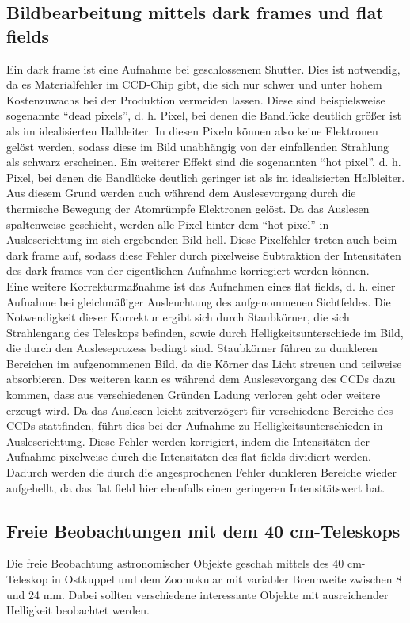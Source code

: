 \subsection{Bildbearbeitung mittels dark frames und flat fields}
Ein dark frame ist eine Aufnahme bei geschlossenem Shutter. Dies ist notwendig, da es Materialfehler im CCD-Chip gibt, die sich nur schwer und unter hohem Kostenzuwachs bei der Produktion vermeiden lassen. Diese sind beispielsweise sogenannte \enquote{dead pixels}, d. h. Pixel, bei denen die Bandlücke deutlich größer ist als im idealisierten Halbleiter. In diesen Pixeln können also keine Elektronen gelöst werden, sodass diese im Bild unabhängig von der einfallenden Strahlung als schwarz erscheinen.
Ein weiterer Effekt sind die sogenannten \enquote{hot pixel}. d. h. Pixel, bei denen die Bandlücke deutlich geringer ist als im idealisierten Halbleiter. Aus diesem Grund  werden auch während dem Auslesevorgang durch die thermische Bewegung der Atomrümpfe Elektronen gelöst. Da das Auslesen spaltenweise geschieht, werden alle Pixel hinter dem \enquote{hot pixel} in Ausleserichtung im sich ergebenden Bild hell. Diese Pixelfehler treten auch beim dark frame auf, sodass diese Fehler durch pixelweise Subtraktion der Intensitäten des dark frames von der eigentlichen Aufnahme korriegiert werden können. \\
Eine weitere Korrekturmaßnahme ist das Aufnehmen eines flat fields, d. h. einer Aufnahme bei gleichmäßiger Ausleuchtung des aufgenommenen Sichtfeldes. Die Notwendigkeit dieser Korrektur ergibt sich durch Staubkörner, die sich Strahlengang des Teleskops befinden, sowie durch Helligkeitsunterschiede im Bild, die durch den Ausleseprozess bedingt sind. Staubkörner führen zu dunkleren Bereichen im aufgenommenen Bild, da die Körner das Licht streuen und teilweise absorbieren. Des weiteren kann es während dem Auslesevorgang des CCDs dazu kommen, dass aus verschiedenen Gründen Ladung verloren geht oder weitere erzeugt wird. Da das Auslesen leicht zeitverzögert für verschiedene Bereiche des CCDs stattfinden, führt dies bei der Aufnahme zu Helligkeitsunterschieden in Ausleserichtung. Diese Fehler werden korrigiert, indem die Intensitäten der Aufnahme pixelweise durch die Intensitäten des flat fields dividiert werden. Dadurch werden die durch die angesprochenen Fehler dunkleren Bereiche wieder aufgehellt, da das flat field hier ebenfalls einen geringeren Intensitätswert hat. 

\subsection{Freie Beobachtungen mit dem 40 cm-Teleskops}
Die freie Beobachtung astronomischer Objekte geschah mittels des 40 cm-Teleskop in Ostkuppel und dem Zoomokular mit variabler Brennweite zwischen 8 und 24 mm. Dabei sollten verschiedene interessante Objekte mit ausreichender Helligkeit beobachtet werden.  